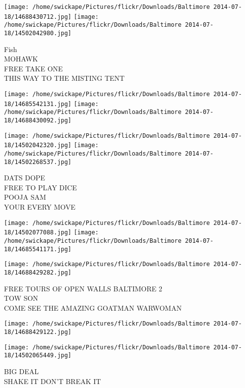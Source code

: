 \documentclass[10pt,letterpaper]{article}
\begin{document}
\texttt{[image: /home/swickape/Pictures/flickr/Downloads/Baltimore 2014-07-18/14688430712.jpg]}
\texttt{[image: /home/swickape/Pictures/flickr/Downloads/Baltimore 2014-07-18/14502042980.jpg]}

Fish\\
MOHAWK\\
FREE TAKE ONE\\
THIS WAY TO THE MISTING TENT\\
\pagebreak

\texttt{[image: /home/swickape/Pictures/flickr/Downloads/Baltimore 2014-07-18/14685542131.jpg]}
\texttt{[image: /home/swickape/Pictures/flickr/Downloads/Baltimore 2014-07-18/14688430092.jpg]}

\texttt{[image: /home/swickape/Pictures/flickr/Downloads/Baltimore 2014-07-18/14502042320.jpg]}
\texttt{[image: /home/swickape/Pictures/flickr/Downloads/Baltimore 2014-07-18/14502268537.jpg]}

DATS DOPE\\
FREE TO PLAY DICE\\
POOJA SAM\\
YOUR EVERY MOVE\\
\pagebreak

\texttt{[image: /home/swickape/Pictures/flickr/Downloads/Baltimore 2014-07-18/14502077088.jpg]}
\texttt{[image: /home/swickape/Pictures/flickr/Downloads/Baltimore 2014-07-18/14685541171.jpg]}

\vspace{0.25in}
\texttt{[image: /home/swickape/Pictures/flickr/Downloads/Baltimore 2014-07-18/14688429282.jpg]}

FREE TOURS OF OPEN WALLS BALTIMORE 2\\
TOW SON\\
COME SEE THE AMAZING GOATMAN WARWOMAN\\
\pagebreak

\texttt{[image: /home/swickape/Pictures/flickr/Downloads/Baltimore 2014-07-18/14688429122.jpg]}

\vspace{0.25in}
\texttt{[image: /home/swickape/Pictures/flickr/Downloads/Baltimore 2014-07-18/14502065449.jpg]}

BIG DEAL\\
SHAKE IT DON'T BREAK IT\\
\pagebreak
\end{document}
